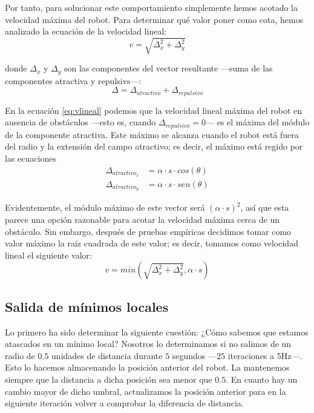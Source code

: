 \documentclass[a4paper, 11pt, titlepage]{article}
\begin{document}
    Por tanto, para solucionar este comportamiento simplemente hemos acotado la velocidad máxima del robot. Para determinar qué valor poner como cota, hemos analizado la ecuación de la velocidad lineal:
    \begin{equation}
        v = \sqrt{\Delta_x^2 + \Delta_y^2}
        \label{eq:vlineal}
    \end{equation}

    donde $\Delta_x$ y $\Delta_y$ son las componentes del vector resultante ---suma de las componentes atractiva y repulsivs---:
    \[
    \Delta = \Delta_{atractivo} + \Delta_{repulsivo}
    \]

    En la ecuación \ref{eq:vlineal} podemos que la velocidad lineal máxima del robot en ausencia de obstáculos ---esto es, cuando $\Delta_{repulsivo} = 0$--- es el máxima del módulo de la componente atractiva. Este máximo se alcanza cuando el robot está fuera del radio y la extensión del campo atractivo; es decir, el máximo está regido por las ecuaciones
    \begin{align*}
        \Delta_{atractivo_x} &= \alpha \cdot s \cdot cos(\theta) \\
        \Delta_{atractivo_y} &= \alpha \cdot s \cdot sen(\theta)
    \end{align*}

    Evidentemente, el módulo máximo de este vector será $(\alpha \cdot s)^2$, así que esta parece una opción razonable para acotar la velocidad máxima cerca de un obstáculo. Sin embargo, después de pruebas empíricas decidimos tomar como valor máximo la raíz cuadrada de este valor; es decir, tomamos como velocidad lineal el siguiente valor:
    \[
    v = min(\sqrt{\Delta_x^2 + \Delta_y^2}, \alpha \cdot s)
    \]


  \subsection{Salida de mínimos locales}
    Lo primero ha sido determinar la siguiente cuestión: ¿Cómo sabemos que estamos atascados en un mínimo local? Nosotros lo determinamos si no salimos de un radio de $0.5$ unidades de distancia durante $5$ segundos ---$25$ iteraciones a 5Hz---. Esto lo hacemos almacenando la posición anterior del robot. La mantenemos siempre que la distancia a dicha posición sea menor que $0.5$. En cuanto hay un cambio mayor de dicho umbral, actualizamos la posición anterior para en la siguiente iteración volver a comprobar la diferencia de distancia.
\end{document}
